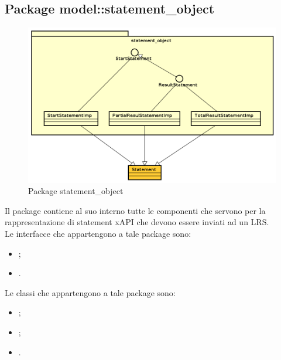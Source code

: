 \documentclass[../Tesi.tex]{subfiles}
\begin{document}
	\subsection{Package model::statement\_object}
		\begin{figure}[H]
			\centering
			\includegraphics[scale=0.6]{images/package_diagrams/statement_object}
				\caption{Package statement\_object}
			\label{fig:StrutturaMVP}
		\end{figure}
		Il package  contiene al suo interno tutte le componenti che servono per la rappresentazione di statement xAPI che devono essere inviati ad un LRS.\\
		Le interfacce che appartengono a tale package sono:
		\begin{itemize}
			\item {};
			\item {}.
		\end{itemize}
		Le classi che appartengono a tale package sono:
		\begin{itemize}
			\item {};
			\item {};
			\item {}.
		\end{itemize}
\end{document}
